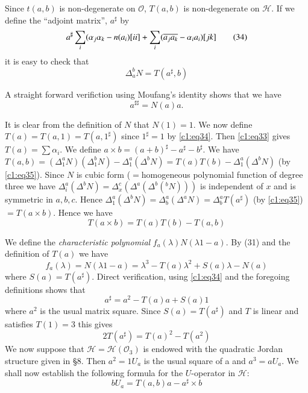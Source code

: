 Since $t(a,b)$ is non-degenerate on $\mathcal{O}$, $T(a,b)$ is
non-degenerate on $\mathscr{H}$. If we define the ``adjoint matrix'',
$a^{\sharp}$ by
\begin{equation*}
a^{\sharp}\sum\limits_{i}(\alpha_j\alpha_k-n(a_i)[ii] + \sum\limits_i
(\overline{a_ja_k}-\alpha_i a_i)[jk]\tag{34}\label{c1:eq34} 
\end{equation*}
it is easy to check that
\begin{equation*}
  \Delta^{b}_aN=T(a^{\sharp},b)\tag{35}\label{c1:eq35}
\end{equation*}

A straight forward verifiction using Moufang's identity shows that we
have
\begin{equation*}
  a^{\sharp\sharp}=N(a)a.\tag{36}\label{c1:eq36}
\end{equation*}

It is clear from the definition of $N$ that $N(1)=1$. We now define
$T(a)=T(a, 1)=T(a,1^{\sharp})$ since $1^{\sharp}=1$ by \eqref{c1:eq34}. Then
\eqref{c1:eq33} gives $T(a)=\sum\alpha_i$. We define $a\times
b=(a+b)^{\sharp}-a^{\sharp}-b^{\sharp}$. We have $T(a,b)=(\Delta_1^{a}
N)(\Delta_1^{b} N)-\Delta^{a}_1(\Delta^{b}
N)=T(a)T(b)-\Delta_1^{a}(\Delta^{b} N)$ (by \eqref{c1:eq35}). Since $N$ is
cubic form ($=$homogeneous polynomial function of degree three we have
$\Delta_{i}^{a}(\Delta^{b}N)=\Delta_x^{c}(\Delta^{a}
(\Delta^{b}(^{b}N)))$ is independent of $x$ and is symmetric in $a, b,
c$. Hence $\Delta^{a}_{1}(\Delta^{b}
N)=\Delta_b^{a}(\Delta^{a}N)=\Delta_b^{a}T(a^{\sharp})$ (by
\eqref{c1:eq35})$=T(a\times b)$. Hence we have
\begin{equation*}
  T(a\times b)=T(a)T(b)-T(a,b)\tag{37}\label{c1:eq37}
\end{equation*}\pageoriginale

 We define the {\em characteristic polynomial} $f_a(\lambda)N(\lambda
 1-a)$. By (31) and the definition of $T(a)$ we have
\begin{equation*}
  f_a(\lambda)=N(\lambda 1-a) = \lambda^{3}-T(a) \lambda^{2} +
  S(a)\lambda -N(a)\tag{38}\label{c1:eq38} 
\end{equation*}
where $S(a)=T(a^{\sharp})$. Direct verification, using \eqref{c1:eq34} and the
foregoing definitions shows that
\begin{equation*}
a^{\sharp}=a^{2}-T(a)a+S(a)1\tag{39}\label{c1:eq39}
\end{equation*}
where $a^{2}$ is the usual matrix square. Since $S(a)=T(a^{\sharp})$
and $T$ is linear and satisfies $T(1)=3$ this gives
\begin{equation*}
  2T(a^{\sharp})=T(a)^{2}-T(a^{2})\tag{40}\label{c1:eq40}
\end{equation*}
We now suppose that $\mathscr{H}=\mathscr{H}(\mathcal{O}_3)$ is
endowed with the quadratic Jordan structure given in \S $8$. Then
$a^{2}=1U_a$ is the usual square of a and $a^{3}=aU_a$. We shall now
establish the following formula for the $U$-operator in $\mathscr{H}$:
\begin{equation*}
  bU_a=T(a,b)a-a^{\sharp}\times b\tag{41}\label{c1:eq41} 
\end{equation*}

